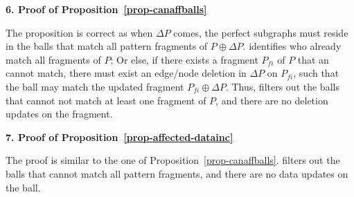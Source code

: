 
\noindent
{\textbf{6. Proof of Proposition~\ref{prop-canaffballs}}}

The proposition is correct as when $\Delta P$ comes, the perfect subgraphs must reside in the balls that match all pattern fragments of $P\oplus \Delta P$.
\identifyaffball identifies \affballsx who already match all fragments of $P$;
Or else, if there exists a fragment $P_{fi}$ of $P$ that an \affballx cannot match,
there must exist an edge/node deletion in $\Delta P$ on $P_{fi}$,
such that the ball may match the updated fragment $P_{fi}\oplus \Delta P$.
Thus, \identifyaffball filters out the balls that cannot not match at least one fragment of $P$, and there are no deletion updates on the fragment.

\noindent
{\textbf{7. Proof of Proposition~\ref{prop-affected-datainc}}}
	
The proof is similar to the one of Proposition~\ref{prop-canaffballs}.
\identifyaffball filters out the balls that cannot match all pattern fragments,	and there are no data updates on the ball.


